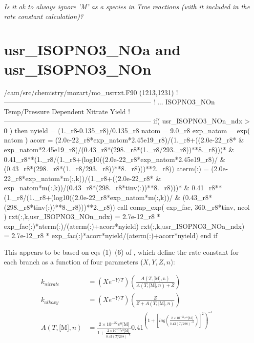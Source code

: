 \documentclass[titlepage]{article}
\begin{document}
\textit{\Large Is it ok to always ignore 'M' as a species in Troe reactions (with it included in the rate constant calculation)?}


\section{usr\_ISOPNO3\_NOa and usr\_ISOPNO3\_NOn}

\begin{blockcode}[commandchars=\\\{\}]
\color{gray}/cam/src/chemistry/mozart/mo_usrrxt.F90 (1213,1231)
!-----------------------------------------------------------------
!       ... ISOPNO3_NOn Temp/Pressure Dependent Nitrate Yield
!-----------------------------------------------------------------
       if( usr_ISOPNO3_NOn_ndx > 0 ) then
          nyield = (1._r8-0.135_r8)/0.135_r8
          natom = 9.0_r8
          exp_natom = exp( natom )
          acorr = (2.0e-22_r8*exp_natom*2.45e19_r8)/(1._r8+((2.0e-22_r8* &
                      exp_natom*2.45e19_r8)/(0.43_r8*(298._r8*(1._r8/293._r8))**8._r8)))* &
                      0.41_r8**(1._r8/(1._r8+(log10((2.0e-22_r8*exp_natom*2.45e19_r8)/ &
                      (0.43_r8*(298._r8*(1._r8/293._r8))**8._r8)))**2._r8))
          aterm(:) = (2.0e-22_r8*exp_natom*m(:,k))/(1._r8+((2.0e-22_r8* &
                      exp_natom*m(:,k))/(0.43_r8*(298._r8*tinv(:))**8._r8)))* &
                      0.41_r8**(1._r8/(1._r8+(log10((2.0e-22_r8*exp_natom*m(:,k))/ &
                      (0.43_r8*(298._r8*tinv(:))**8._r8)))**2._r8))
          call comp_exp( exp_fac, 360._r8*tinv, ncol )
          rxt(:,k,usr_ISOPNO3_NOn_ndx) = 2.7e-12_r8 * exp_fac(:)*aterm(:)/(aterm(:)+acorr*nyield)
          rxt(:,k,usr_ISOPNO3_NOa_ndx) = 2.7e-12_r8 * exp_fac(:)*acorr*nyield/(aterm(:)+acorr*nyield)
       end if
\end{blockcode}

This appears to be based on eqs (1)--(6) of \cite{Wennberg2018}, which define the rate constant for each branch as a function of four parameters ($X, Y, Z, n$):

\begin{equation}
\begin{split}
k_{nitrate} & = \left(X e^{-Y/T}\right) \left(\frac{A(T, \mbox{[M]}, n)}{A(T, \mbox{[M]}, n) + Z}\right) \\
k_{alkoxy} & = \left(X e^{-Y/T}\right)\left(\frac{Z}{Z + A(T, \mbox{[M]}, n)}\right) \\
A(T, \mbox{[M]}, n) & = \frac{2 \times 10^{-22} e^n \mbox{[M]}}{1 + \frac{2 \times 10^{-22} e^n \mbox{[M]}}{0.43(T/298)^{-8}}} 0.41^{(1+[log( \frac{2 \times 10^{-22} e^n \mbox{[M]}}{0.43(T/298)^{-8}})]^2)^{-1}}
\end{split}
\end{equation}
\end{document}
